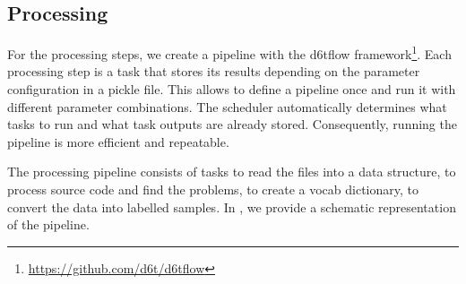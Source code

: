 \subsection{Processing}
For the processing steps, we create a pipeline with the d6tflow framework\footnote{\url{https://github.com/d6t/d6tflow}}. Each processing step is a task that stores its results depending on the parameter configuration in a pickle file. This allows to define a pipeline once and run it with different parameter combinations. The scheduler automatically determines what tasks to run and what task outputs are already stored. Consequently, running the pipeline is more efficient and repeatable.

The processing pipeline consists of tasks to read the files into a data structure, to process source code and find the problems, to create a vocab dictionary, to convert the data into labelled samples. In , we provide a schematic representation of the pipeline.

